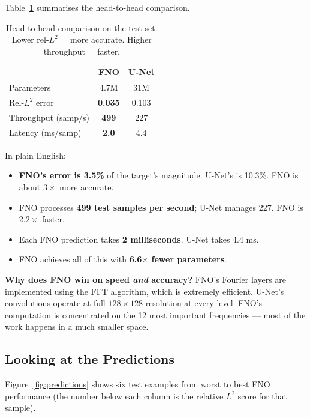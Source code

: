 \documentclass[11pt,twocolumn]{article}
\begin{document}
Table~\ref{tab:standard} summarises the head-to-head comparison.

\begin{table}[H]
  \centering
  \caption{Head-to-head comparison on the test set.
           Lower rel-$L^2$ = more accurate.
           Higher throughput = faster.}
  \label{tab:standard}
  \begin{tabular}{lcc}
    \toprule
    & \textbf{FNO} & \textbf{U-Net} \\
    \midrule
    Parameters        & 4.7M              & 31M \\
    Rel-$L^2$ error   & \textbf{0.035}    & 0.103 \\
    Throughput (samp/s) & \textbf{499}    & 227 \\
    Latency (ms/samp) & \textbf{2.0}      & 4.4 \\
    \bottomrule
  \end{tabular}
\end{table}

In plain English:
\begin{itemize}
  \item \textbf{FNO's error is 3.5\%} of the target's magnitude.
        U-Net's is 10.3\%. FNO is about $3\times$ more accurate.
  \item FNO processes \textbf{499 test samples per second};
        U-Net manages 227. FNO is $2.2\times$ faster.
  \item Each FNO prediction takes \textbf{2 milliseconds}.
        U-Net takes 4.4 ms.
  \item FNO achieves all of this with \textbf{6.6$\times$ fewer parameters}.
\end{itemize}

\begin{keypoint}
\textbf{Why does FNO win on speed \emph{and} accuracy?}
FNO's Fourier layers are implemented using the FFT algorithm, which is extremely
efficient.
U-Net's convolutions operate at full $128\times128$ resolution at every level.
FNO's computation is concentrated on the 12 most important frequencies ---
most of the work happens in a much smaller space.
\end{keypoint}

\subsection{Looking at the Predictions}

Figure~\ref{fig:predictions} shows six test examples from worst to best FNO
performance (the number below each column is the relative $L^2$ score for that
sample).
\end{document}
